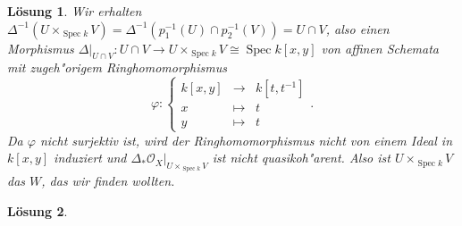 \documentclass[paper = A4, fontsize=12pt, numbers=noendperiod, chapterprefix=true]{scrbook}
\theoremstyle{break}
\newtheorem{Loes}{L\"osung}
\theoremstyle{nonumberbreak}
\theoremstyle{nonumberplain}
\DeclareMathOperator{\Spec}{Spec}
\newcommand{\calO}{\mathcal{O}}
\begin{document}
\begin{Loes}
Wir erhalten $\Delta^{-1}(U \times_{\Spec k} V) = \Delta^{-1}(p_1^{-1}(U) \cap p_2^{-1}(V)) = U \cap V$, also einen Morphismus  $\Delta|_{U \cap V} \colon U \cap V \to U \times_{\Spec k} V \cong \Spec k[x,y]$ von affinen Schemata mit zugeh"origem Ringhomomorphismus 
$$\varphi: \left\{\begin{array}{rcl}
                  k[x,y] & \to& k[t,t^{-1}] \\ x &\mapsto& t \\ y &\mapsto& t                                                                                                                                                                                                                                                                                                                                                                                                                                                                                                            \end{array} \right. .$$
Da $\varphi$ nicht surjektiv ist, wird der Ringhomomorphismus nicht von einem Ideal in $k[x,y]$ induziert und $\Delta_\ast \calO_X|_{U \times_{\Spec k} V}$ ist nicht quasikoh"arent. Also ist $U \times_{\Spec k} V$ das $W$, das wir finden wollten.
\end{Loes}

\begin{Loes}
 
\end{Loes}
\end{document}
